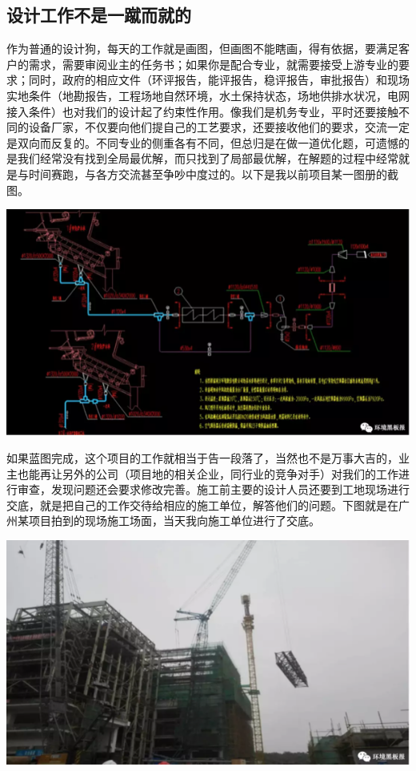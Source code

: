 \documentclass[]{book}
\begin{document}
\subsection{设计工作不是一蹴而就的}

作为普通的设计狗，每天的工作就是画图，但画图不能瞎画，得有依据，要满足客户的需求，需要审阅业主的任务书；如果你是配合专业，就需要接受上游专业的要求；同时，政府的相应文件（环评报告，能评报告，稳评报告，审批报告）和现场实地条件（地勘报告，工程场地自然环境，水土保持状态，场地供排水状况，电网接入条件）也对我们的设计起了约束性作用。像我们是机务专业，平时还要接触不同的设备厂家，不仅要向他们提自己的工艺要求，还要接收他们的要求，交流一定是双向而反复的。不同专业的侧重各有不同，但总归是在做一道优化题，可遗憾的是我们经常没有找到全局最优解，而只找到了局部最优解，在解题的过程中经常就是与时间赛跑，与各方交流甚至争吵中度过的。以下是我以前项目某一图册的截图。

\includegraphics[width=8.33in]{images/sisi2}

如果蓝图完成，这个项目的工作就相当于告一段落了，当然也不是万事大吉的，业主也能再让另外的公司（项目地的相关企业，同行业的竞争对手）对我们的工作进行审查，发现问题还会要求修改完善。施工前主要的设计人员还要到工地现场进行交底，就是把自己的工作交待给相应的施工单位，解答他们的问题。下图就是在广州某项目拍到的现场施工场面，当天我向施工单位进行了交底。

\includegraphics[width=8.33in]{images/sisi3}
\end{document}
